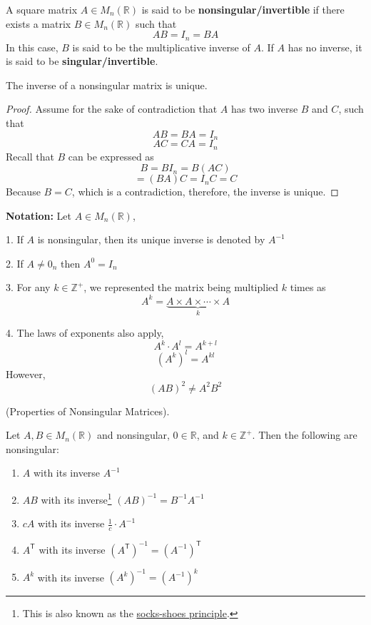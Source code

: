 \begin{definition}
A square matrix $A \in M_n(\mathbb{R})$ is said to be \textbf{nonsingular/invertible} if there exists a matrix $B \in M_n(\mathbb{R})$ such that
$$AB = I_n = BA$$
In this case, $B$ is said to be the multiplicative inverse of $A$. If $A$ has no inverse, it is said to be \textbf{singular/invertible}.
\end{definition}

\begin{theorem}
The inverse of a nonsingular matrix is unique.
\end{theorem}

\begin{proof}
Assume for the sake of contradiction that $A$ has two inverse $B$ and $C$, such that
$$AB = BA = I_n$$
$$AC = CA = I_n$$
Recall that $B$ can be expressed as
$$B = BI_n = B(AC)$$
$$= (BA)C = I_nC = C$$
Because $B = C$, which is a contradiction, therefore, the inverse is unique.

\end{proof}

\textbf{Notation:} Let $A \in M_n(\mathbb{R})$,

1. If $A$ is nonsingular, then its unique inverse is denoted by $A^{-1}$

2. If $A \neq 0_n$ then $A^0 = I_n$

3. For any $k \in \mathbb{Z}^+$, we represented the matrix being multiplied $k$ times as
$$A^k = \underbrace{A \times A \times \cdots \times A}_{k}$$

4. The laws of exponents also apply,
$$A^k \cdot A^l = A^{k+l}$$
$$(A^k)^l = A^{kl}$$
However, 
$$(AB)^2 \neq A^2B^2$$

\begin{remark}(Properties of Nonsingular Matrices).

Let $A, B \in M_n(\mathbb{R})$ and nonsingular, $0 \in \mathbb{R}$, and $k \in \mathbb{Z}^+$. Then the following are nonsingular:
\begin{enumerate}
    \item $A$ with its inverse $A^{-1}$
    \item $AB$ with its inverse\footnote{This is also known as the \href{https://math.stackexchange.com/questions/2435303/russells-shoes-and-socks}{socks-shoes principle}.} $(AB)^{-1} = B^{-1}A^{-1}$
    \item $cA$ with its inverse $\displaystyle \frac{1}{c} \cdot A^{-1}$
    \item $A^{\mathsf{T}}$ with its inverse $(A^{\mathsf{T}})^{-1} = (A^{-1})^{\mathsf{T}}$
    \item $A^k$ with its inverse $(A^k)^{-1} = (A^{-1})^k$
\end{enumerate}
\end{remark}

